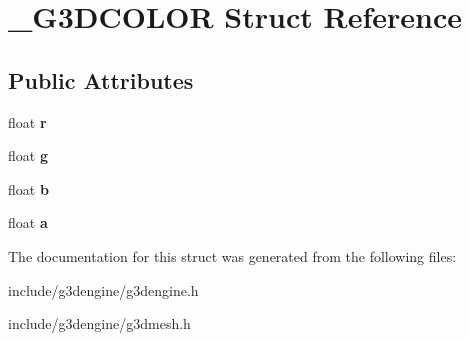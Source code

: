 \hypertarget{struct__G3DCOLOR}{}\section{\+\_\+\+G3\+D\+C\+O\+L\+OR Struct Reference}
\label{struct__G3DCOLOR}
\subsection*{Public Attributes}
\begin{DoxyCompactItemize}
\item 
\mbox{\label{struct__G3DCOLOR_a5d4de59d19a31c17b892f15478ff3a34}} 
float {\bfseries r}
\item 
\mbox{\label{struct__G3DCOLOR_a7217a9ae029b46909502cc44d404a3a2}} 
float {\bfseries g}
\item 
\mbox{\label{struct__G3DCOLOR_ae658e14b2fc92f31bb490f8df414106d}} 
float {\bfseries b}
\item 
\mbox{\label{struct__G3DCOLOR_a59eda935f734372661eee4aadc6f31f6}} 
float {\bfseries a}
\end{DoxyCompactItemize}


The documentation for this struct was generated from the following files\+:\begin{DoxyCompactItemize}
\item 
include/g3dengine/g3dengine.\+h\item 
include/g3dengine/g3dmesh.\+h\end{DoxyCompactItemize}
